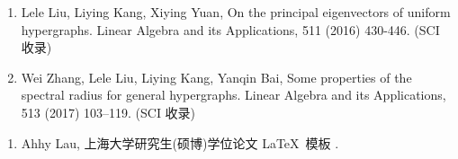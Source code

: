 \begin{publications}
\begin{enumerate}
\item Lele Liu, Liying Kang, Xiying Yuan, 
On the principal eigenvectors of uniform hypergraphs. 
Linear Algebra and its Applications, 511 (2016) 430-446. (SCI 收录)

\item Wei Zhang, Lele Liu, Liying Kang, Yanqin Bai, 
Some properties of the spectral radius for general hypergraphs. 
Linear Algebra and its Applications, 513 (2017) 103–119. (SCI 收录)
\end{enumerate}

\begin{enumerate}
\item Ahhy Lau, 上海大学研究生(硕博)学位论文 \LaTeX\ 模板 \shuthesis.
\end{enumerate}
\end{publications}